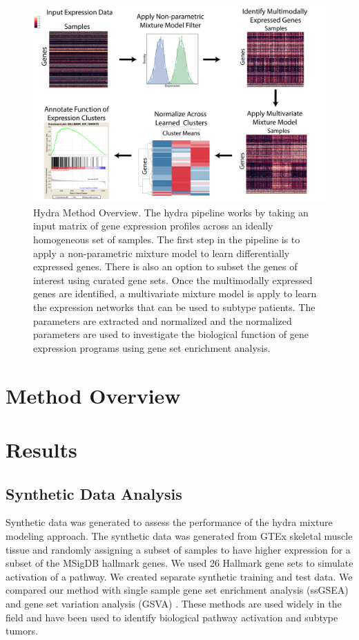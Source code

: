 \documentclass[fleqn,10pt]{wlscirep}
\begin{document}
\begin{figure}
	\centering
	\includegraphics[width=0.75\linewidth]{images/hydra-overview@2x.png}
	\caption{Hydra Method Overview. The hydra pipeline works by taking an input matrix of gene expression profiles across an ideally homogeneous set of samples. The first step in the pipeline is to apply a non-parametric mixture model to learn differentially expressed genes. There is also an option to subset the genes of interest using curated gene sets. Once the multimodally expressed genes are identified, a multivariate mixture model is apply to learn the expression networks that can be used to subtype patients. The parameters are extracted and normalized and the normalized parameters are used to investigate the biological function of gene expression programs using gene set enrichment analysis.}
	\label{sfig:hydra-overview}
\end{figure}

\section*{Method Overview}


\section*{Results}

\subsection*{Synthetic Data Analysis}
Synthetic data was generated to assess the performance of the hydra mixture modeling approach. The synthetic data was generated from GTEx skeletal muscle tissue and randomly assigning a subset of samples to have higher expression for a subset of the MSigDB hallmark genes. We used 26 Hallmark gene sets to simulate activation of a pathway. We created separate synthetic training and test data. We compared our method with single sample gene set enrichment analysis (ssGSEA) \cite{barbie2009systematic} and gene set variation analysis (GSVA) \cite{hanzelmann2013gsva}. These methods are used widely in the field and have been used to identify biological pathway activation and subtype tumors. 
\end{document}
